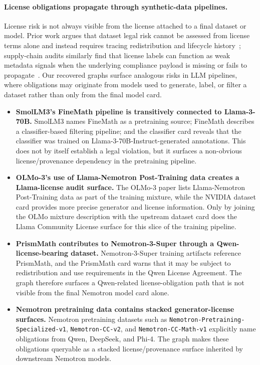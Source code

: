 \paragraph{License obligations propagate through synthetic-data pipelines.}

License risk is not always visible from the license attached to a final dataset or model. Prior work argues that dataset legal risk cannot be assessed from license terms alone and instead requires tracing redistribution and lifecycle history~\cite{kim2025trustlicensesseedataset}; supply-chain audits similarly find that license labels can function as weak metadata signals when the underlying compliance payload is missing or fails to propagate~\cite{jewitt2026permissivewashingopenaisupply}. Our recovered graphs surface analogous risks in LLM pipelines, where obligations may originate from models used to generate, label, or filter a dataset rather than only from the final model card.

\begin{itemize}
    \item \textbf{SmolLM3's FineMath pipeline is transitively connected to Llama-3-70B.}
    SmolLM3 names FineMath as a pretraining source; FineMath describes a classifier-based filtering pipeline; and the classifier card reveals that the classifier was trained on Llama-3-70B-Instruct-generated annotations. This does not by itself establish a legal violation, but it surfaces a non-obvious license/provenance dependency in the pretraining pipeline.

    \item \textbf{OLMo-3's use of Llama-Nemotron Post-Training data creates a Llama-license audit surface.}
    The OLMo-3 paper lists Llama-Nemotron Post-Training data as part of the training mixture, while the NVIDIA dataset card provides more precise generator and license information. Only by joining the OLMo mixture description with the upstream dataset card does the Llama Community License surface for this slice of the training pipeline.

    \item \textbf{PrismMath contributes to Nemotron-3-Super through a Qwen-license-bearing dataset.}
    Nemotron-3-Super training artifacts reference PrismMath, and the PrismMath card warns that it may be subject to redistribution and use requirements in the Qwen License Agreement. The graph therefore surfaces a Qwen-related license-obligation path that is not visible from the final Nemotron model card alone.

    \item \textbf{Nemotron pretraining data contains stacked generator-license surfaces.}
    Nemotron pretraining datasets such as \texttt{Nemotron-Pretraining-Specialized-v1}, \texttt{Nemotron-CC-v2}, and \texttt{Nemotron-CC-Math-v1} explicitly name obligations from Qwen, DeepSeek, and Phi-4. The graph makes these obligations queryable as a stacked license/provenance surface inherited by downstream Nemotron models.
\end{itemize}

